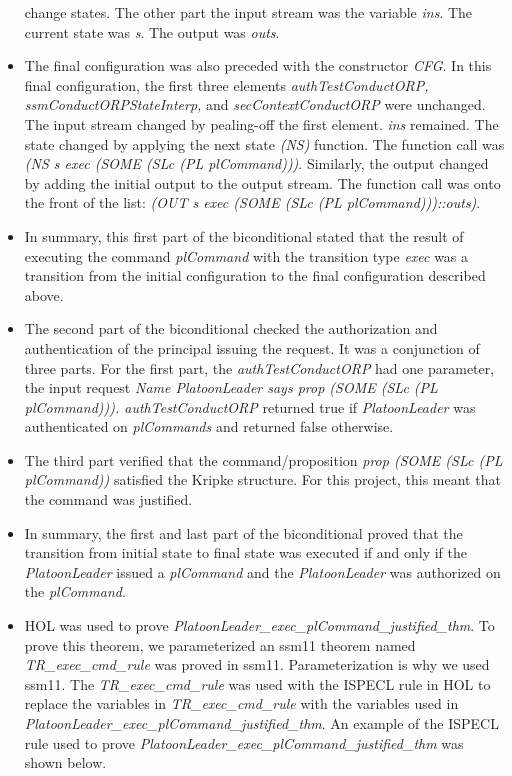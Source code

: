 \begin{itemize}
  change states.  The other part the input stream was the variable \textit{ins}.  The current state
  was \textit{s}.  The output was \textit{outs}.
\item The final configuration was also preceded with the constructor \textit{CFG}.  In this final
  configuration, the first three elements \textit{authTestConductORP, ssmConductORPStateInterp,} and
  \textit{secContextConductORP}  were unchanged.  The input stream changed by pealing-off the first
  element.  \textit{ins} remained.  The state changed by applying the next state \textit{(NS)} function.
  The function call was \textit{(NS s exec (SOME (SLc (PL plCommand)))}.  Similarly, the output changed
  by adding the initial output to the output stream. The function call was onto the front of the list:
  \textit{(OUT s exec (SOME (SLc (PL plCommand)))::outs)}.
\item In summary, this first part of the biconditional stated that the result of executing the command
  \textit{plCommand} with the transition type \textit{exec} was a transition from the initial configuration
  to the final configuration described above.
\item The second part of the biconditional checked the authorization and authentication of the principal
  issuing the request.  It was a conjunction of three parts.  For the first part, the \textit{authTestConductORP}
  had one parameter, the input request \textit{Name PlatoonLeader says prop (SOME (SLc (PL plCommand))).
    authTestConductORP} returned true if \textit{PlatoonLeader} was authenticated on \textit{plCommands}
  and returned false otherwise.
\item The third part verified that the command/proposition \textit{prop (SOME (SLc (PL plCommand))}
  satisfied the Kripke structure.  For this project, this meant that the command was justified.
\item In summary, the first and last part of the biconditional proved that the transition from initial
  state to final state was executed if and only if the \textit{PlatoonLeader} issued a \textit{plCommand}
  and the \textit{PlatoonLeader} was authorized on the \textit{plCommand}.
\item HOL was used to prove \textit{PlatoonLeader_exec_plCommand_justified_thm}.  To prove this theorem,
  we parameterized an ssm11 theorem named \textit{TR_exec_cmd_rule} was proved in ssm11.  Parameterization
  is why we used ssm11.  The \textit{TR_exec_cmd_rule}  was used with the ISPECL rule in HOL to replace the
  variables in \textit{TR_exec_cmd_rule}  with the variables used in \textit{PlatoonLeader_exec_plCommand_justified_thm}.  An example of the ISPECL rule used to prove \textit{PlatoonLeader_exec_plCommand_justified_thm} was shown below.

\end{itemize}

